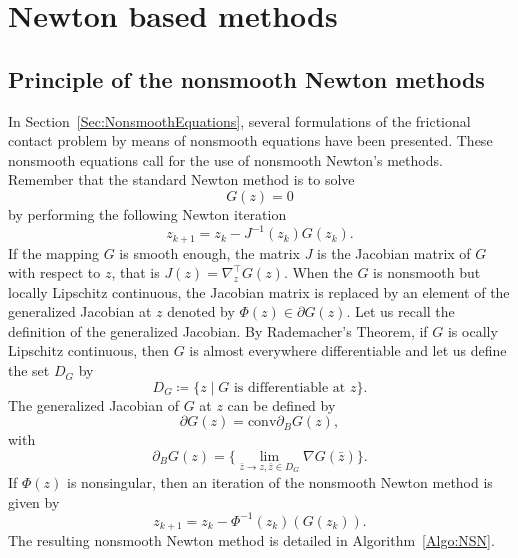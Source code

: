 {\clearpage
\section{Newton based methods}
\label{sec:newtonmethods}


\subsection{Principle of the nonsmooth Newton methods}

In Section~\ref{Sec:NonsmoothEquations}, several formulations of the frictional contact problem by means of nonsmooth equations  have been presented. These nonsmooth equations call for the use of nonsmooth Newton's methods. Remember that the standard Newton method is to solve
\begin{equation}
  \label{eq:NSN1}
  G(z)=0
\end{equation}
by performing the following Newton iteration
\begin{equation}
  \label{eq:NSN2}
  z_{k+1}  =  z_k -  J^{-1}(z_k) G(z_k).
\end{equation}
If the mapping $G$ is smooth enough, the matrix $J$ is the Jacobian matrix of $G$ with respect to $z$, that is $J(z) = \nabla^\top_z G(z)$.
When the $G$ is nonsmooth but locally Lipschitz continuous,  the Jacobian matrix is replaced by an element of the generalized Jacobian at $z$ denoted by $ \Phi(z) \in \partial G(z)$. Let us recall the definition of the generalized Jacobian. By Rademacher's Theorem, if $G$ is ocally Lipschitz continuous, then $G$ is almost everywhere differentiable and let us define the set $D_G$ by
\begin{equation}
  \label{eq:NSN4}
  D_G \coloneqq \{z \mid G \text{ is differentiable at } z\}.
\end{equation}
The generalized Jacobian of $G$ at $z$ can be defined by
\begin{equation}
  \label{eq:NSN5}
  \partial G(z) = \mbox{conv} \partial_B G(z),
\end{equation}
with
\begin{equation}
  \label{eq:NSN6}
   \partial_B G(z) = \{\lim_{\bar z \rightarrow z, \bar z\in D_G} \nabla G(\bar z)\}.
 \end{equation}
If $\Phi(z)$ is nonsingular, then an iteration of the nonsmooth Newton method is given by
\begin{equation}
  \label{eq:NSN3}
  z_{k+1}  =  z_k -  \Phi^{-1}(z_k) (G(z_k)).
\end{equation}
The resulting nonsmooth Newton method is detailed in Algorithm~\ref{Algo:NSN}.
}

